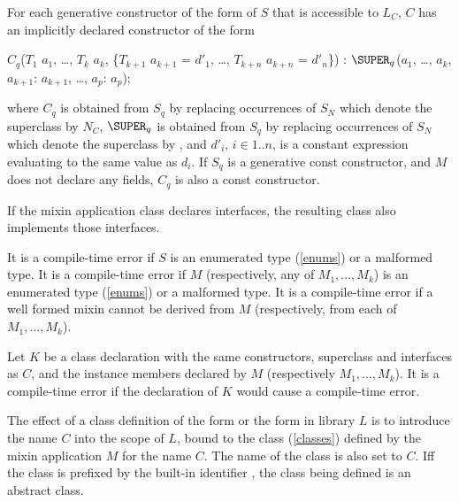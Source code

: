 \documentclass[makeidx]{article}
\begin{document}
\LMHash{}%
For each generative constructor of the form  of $S$ that is accessible to $L_C$, $C$ has an implicitly declared constructor of the form

\begin{normativeDartCode}
$C_q$($T_{1}$ $a_{1}$, \ldots , $T_{k}$ $a_{k}$, \{$T_{k+1}$ $a_{k+1}$ = $d'_1$, \ldots , $T_{k+n}$ $a_{k+n}$ = $d'_n$\})
    : $\SUPER_q$($a_{1}$, \ldots , $a_{k}$, $a_{k+1}$: $a_{k+1}$, \ldots, $a_p$: $a_p$);
\end{normativeDartCode}

\noindent
where $C_q$ is obtained from $S_q$ by replacing occurrences of $S_N$
which denote the superclass by $N_C$,
$\SUPER_q$ is obtained from $S_q$ by replacing occurrences of $S_N$
which denote the superclass by \SUPER{},
and $d'_i$, $i \in 1..n$, is a constant expression evaluating to the same value as $d_i$.
If $S_q$ is a generative const constructor, and $M$ does not declare any
fields, $C_q$ is also a const constructor.

\LMHash{}%
If the mixin application class declares interfaces, the resulting class also implements those interfaces.

\LMHash{}%
It is a compile-time error if $S$ is an enumerated type (\ref{enums}) or a malformed type.
It is a compile-time error if $M$ (respectively, any of $M_1, \ldots, M_k$) is an enumerated type (\ref{enums}) or a malformed type.
It is a compile-time error if a well formed mixin cannot be derived from $M$ (respectively, from each of $M_1, \ldots, M_k$).

\LMHash{}%
Let $K$ be a class declaration with the same constructors, superclass and interfaces as $C$, and the instance members declared by $M$ (respectively $M_1, \ldots, M_k$).
It is a compile-time error if the declaration of $K$ would cause a compile-time error.


\LMHash{}%
The effect of a class definition of the form  or the form  in library $L$ is to introduce the name $C$ into the scope of $L$, bound to the class (\ref{classes}) defined by the mixin application $M$ for the name $C$.
The name of the class is also set to $C$.
If{}f the class is prefixed by the built-in identifier \ABSTRACT{}, the class being defined is an abstract class.
\end{document}
